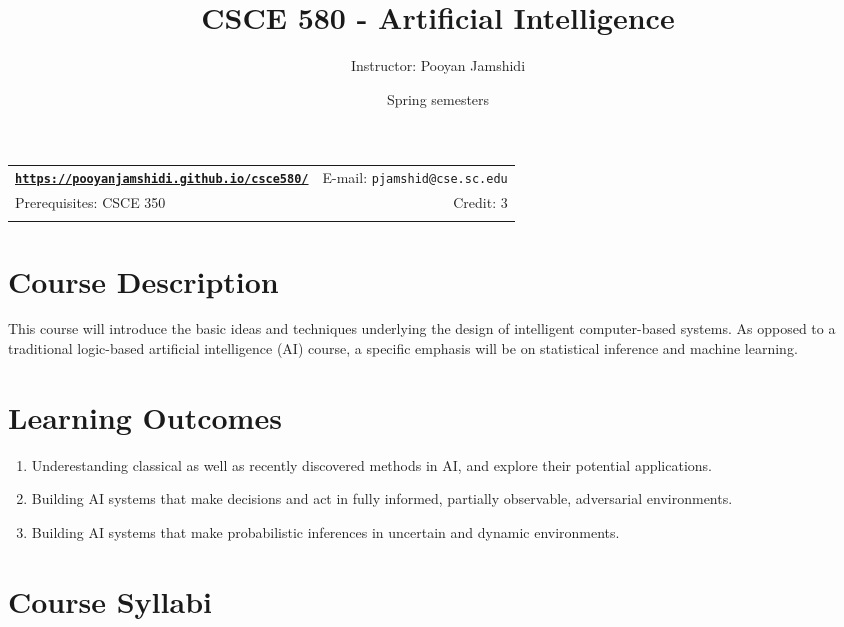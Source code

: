 \documentclass[11pt]{article}
\title{CSCE 580 - Artificial Intelligence}
\author{Instructor: Pooyan Jamshidi}
\date{Spring semesters}
\newcommand{\blankline}{\quad\pagebreak[2]}
\begin{document}
\maketitle

\blankline

\begin{tabular*}{.93\textwidth}{@{\extracolsep{\fill}}lr}


\href{https://pooyanjamshidi.github.io/csce580/}{\tt\bf https://pooyanjamshidi.github.io/csce580/}  & E-mail: \texttt{pjamshid@cse.sc.edu} \\
Prerequisites: CSCE 350 & Credit: 3 \\

&  \\

\hline
\end{tabular*}

\vspace{10mm}

\section*{Course Description}

This course will introduce the basic ideas and techniques underlying the design of intelligent computer-based systems. As opposed to a traditional logic-based artificial intelligence (AI) course, a specific emphasis will be on statistical inference and machine learning. 



\section*{Learning Outcomes}
\begin{enumerate}
\item Underestanding classical as well as recently discovered methods in AI, and explore their potential applications.

\item Building AI systems that make decisions and act in fully informed, partially observable, adversarial environments.

\item Building AI systems that make probabilistic inferences in uncertain and dynamic environments.

\end{enumerate}


\section*{Course Syllabi}
\end{document}

